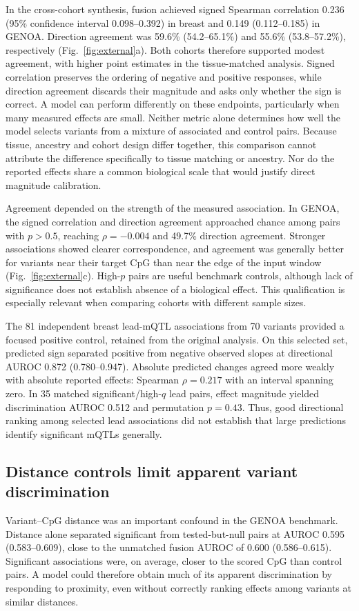 \documentclass[11pt,letterpaper,twocolumn]{article}
\begin{document}
In the cross-cohort synthesis, fusion achieved signed Spearman correlation 0.236 (95\% confidence interval 0.098--0.392) in breast and 0.149 (0.112--0.185) in GENOA. Direction agreement was 59.6\% (54.2--65.1\%) and 55.6\% (53.8--57.2\%), respectively (Fig.~\ref{fig:external}a). Both cohorts therefore supported modest agreement, with higher point estimates in the tissue-matched analysis. Signed correlation preserves the ordering of negative and positive responses, while direction agreement discards their magnitude and asks only whether the sign is correct. A model can perform differently on these endpoints, particularly when many measured effects are small. Neither metric alone determines how well the model selects variants from a mixture of associated and control pairs. Because tissue, ancestry and cohort design differ together, this comparison cannot attribute the difference specifically to tissue matching or ancestry. Nor do the reported effects share a common biological scale that would justify direct magnitude calibration.

Agreement depended on the strength of the measured association. In GENOA, the signed correlation and direction agreement approached chance among pairs with $p>0.5$, reaching $\rho=-0.004$ and 49.7\% direction agreement. Stronger associations showed clearer correspondence, and agreement was generally better for variants near their target CpG than near the edge of the input window (Fig.~\ref{fig:external}c). High-$p$ pairs are useful benchmark controls, although lack of significance does not establish absence of a biological effect. This qualification is especially relevant when comparing cohorts with different sample sizes.

The 81 independent breast lead-mQTL associations from 70 variants provided a focused positive control, retained from the original analysis. On this selected set, predicted sign separated positive from negative observed slopes at directional AUROC 0.872 (0.780--0.947). Absolute predicted changes agreed more weakly with absolute reported effects: Spearman $\rho=0.217$ with an interval spanning zero. In 35 matched significant/high-$q$ lead pairs, effect magnitude yielded discrimination AUROC 0.512 and permutation $p=0.43$. Thus, good directional ranking among selected lead associations did not establish that large predictions identify significant mQTLs generally.

\subsection{Distance controls limit apparent variant discrimination}
Variant--CpG distance was an important confound in the GENOA benchmark. Distance alone separated significant from tested-but-null pairs at AUROC 0.595 (0.583--0.609), close to the unmatched fusion AUROC of 0.600 (0.586--0.615). Significant associations were, on average, closer to the scored CpG than control pairs. A model could therefore obtain much of its apparent discrimination by responding to proximity, even without correctly ranking effects among variants at similar distances.
\end{document}
